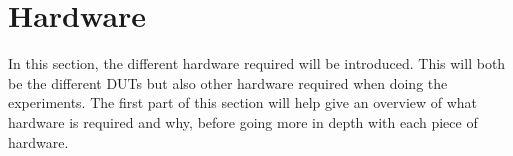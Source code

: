 \section{Hardware}\label{sec:hardware}


In this section, the different hardware required will be introduced. This will both be the different DUTs but also other hardware required when doing the experiments. The first part of this section will help give an overview of what hardware is required and why, before going more in depth with each piece of hardware.




